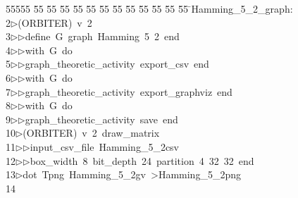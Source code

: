 %
%
\begin{tabbing}
55555 \= 55 \= 55 \= 55 \= 55 \= 55 \= 55 \= 55 \= 55 \= 55 \= 55 \= 55 \= 55 \= \>Hamming\_5\_2\_graph:\\[0pt]
2\>$\triangleright$\>(ORBITER)\ v\ 2\ \\[0pt]
3\>$\triangleright$\>$\triangleright$\>define\ G\ graph\ Hamming\ 5\ 2\ end\ \\[0pt]
4\>$\triangleright$\>$\triangleright$\>with\ G\ do\ \\[0pt]
5\>$\triangleright$\>$\triangleright$\>graph\_theoretic\_activity\ export\_csv\ end\ \\[0pt]
6\>$\triangleright$\>$\triangleright$\>with\ G\ do\ \\[0pt]
7\>$\triangleright$\>$\triangleright$\>graph\_theoretic\_activity\ export\_graphviz\ end\ \\[0pt]
8\>$\triangleright$\>$\triangleright$\>with\ G\ do\ \\[0pt]
9\>$\triangleright$\>$\triangleright$\>graph\_theoretic\_activity\ save\ end\\[0pt]
10\>$\triangleright$\>(ORBITER)\ v\ 2\ draw\_matrix\ \\[0pt]
11\>$\triangleright$\>$\triangleright$\>input\_csv\_file\ Hamming\_5\_2csv\ \\[0pt]
12\>$\triangleright$\>$\triangleright$\>box\_width\ 8\ bit\_depth\ 24\ partition\ 4\ 32\ 32\ end\\[0pt]
13\>$\triangleright$\>dot\ Tpng\ Hamming\_5\_2gv\ {\textgreater}Hamming\_5\_2png\\[0pt]
14\>\end{tabbing}
